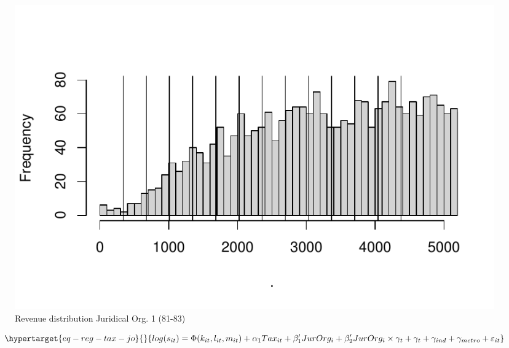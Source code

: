 \documentclass[
  12pt]{article}
\begin{document}
\begin{figure}

{\centering \includegraphics{Tax-Prod_files/figure-pdf/fig-revenue-hist-bunch-1-1.pdf}

}

\caption{\label{fig-revenue-hist-bunch-1}Revenue distribution Juridical
Org. 1 (81-83)}

\end{figure}

\begin{equation}\protect\hypertarget{eq-reg-tax-jo}{}{
log(s_{it})= \Phi(k_{it},l_{it},m_{it})+ \alpha_1Tax_{it}+\mathbf{\beta}_1'JurOrg_i + \beta_2'JurOrg_i\times\gamma_t+ \gamma_t + \gamma_{ind} +\gamma_{metro} + \varepsilon_{it}
}\label{eq-reg-tax-jo}\end{equation}
\end{document}
